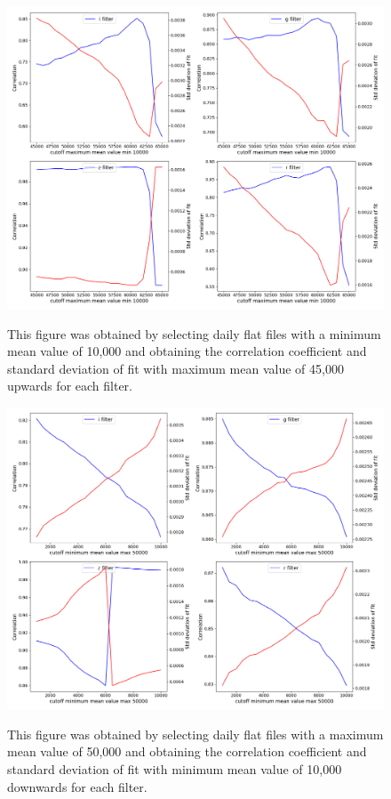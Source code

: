 \begin{figure}[!htbp]
\begin{center}
\includegraphics[scale=0.4]{images/lregmaxes.png}
\end{center}   
\caption{This figure was obtained by selecting daily flat files with a minimum
mean value of 10,000 and obtaining the correlation coefficient and standard
deviation of fit with maximum mean value of 45,000 upwards for each filter.}
\protect\label{fig:lregmaxes}
\end{figure}

\begin{figure}[!htbp]
\begin{center}
\includegraphics[scale=0.4]{images/lregmins.png}
\end{center}   
\caption{This figure was obtained by selecting daily flat files with a maximum
mean value of 50,000 and obtaining the correlation coefficient and
standard deviation of fit with minimum mean value of 10,000 downwards for each
filter.} \protect\label{fig:lregmins}
\end{figure}

